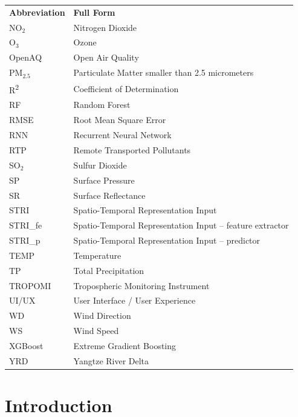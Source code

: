 \documentclass[12pt]{report}
\begin{document}
\newpage
\begin{tabular}{l l}
\textbf{Abbreviation} & \textbf{Full Form} \\
NO$_2$ & Nitrogen Dioxide \\
O$_3$ & Ozone \\
OpenAQ & Open Air Quality \\
PM$_{2.5}$ & Particulate Matter smaller than 2.5 micrometers \\
R\textsuperscript{2} & Coefficient of Determination \\
RF & Random Forest \\
RMSE & Root Mean Square Error \\
RNN & Recurrent Neural Network \\
RTP & Remote Transported Pollutants \\
SO$_2$ & Sulfur Dioxide \\
SP & Surface Pressure \\
SR & Surface Reflectance \\
STRI & Spatio-Temporal Representation Input \\
STRI\_fe & Spatio-Temporal Representation Input – feature extractor \\
STRI\_p & Spatio-Temporal Representation Input – predictor \\
TEMP & Temperature \\
TP & Total Precipitation \\
TROPOMI & Tropospheric Monitoring Instrument \\
UI/UX & User Interface / User Experience \\
WD & Wind Direction \\
WS & Wind Speed \\
XGBoost & Extreme Gradient Boosting \\
YRD & Yangtze River Delta \\
\end{tabular}


\chapter{Introduction}

\end{document}
